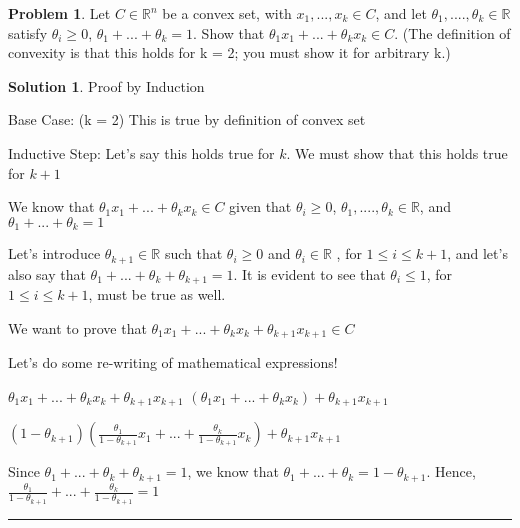 \documentclass{article}
\theoremstyle{definition}
\newtheorem{problem}{Problem}
\def\fline{\rule{0.75\linewidth}{0.5pt}}
\newcommand{\finishline}{\begin{center}\fline\end{center}}
\newtheorem*{solution*}{Solution}
\newenvironment{solution}{\begin{solution*}}{{\finishline} \end{solution*}}
\begin{document}
\begin{problem}
Let $C \in \mathbb{R}^n$ be a convex set, with $x_1, ..., x_k \in C$, and let $\theta_1, ...., \theta_k \in \mathbb{R}$ satisfy $\theta_i \geq 0$, $\theta_1 + ... + \theta_k = 1$. Show that $\theta_1x_1 + ... + \theta_kx_k \in C$. (The definition of convexity is that this holds for k = 2; you must show it for arbitrary k.)

\begin{solution}
    Proof by Induction \newline 

Base Case: (k = 2) \newline 
This is true by definition of convex set \newline 

Inductive Step: \newline
Let's say this holds true for $k$. We must show that this holds true for $k + 1$ \newline 

We know that $\theta_1x_1 + ... + \theta_kx_k \in C$ given that $\theta_i \geq 0$, $\theta_1, ...., \theta_k \in \mathbb{R}$, and $\theta_1 + ... + \theta_k = 1$ \newline 

Let's introduce $\theta_{k + 1} \in \mathbb{R}$ such that $\theta_{i} \geq 0$ and $\theta_i \in \mathbb{R}$ , for $1 \leq i \leq k + 1$, and let's also say that $\theta_1 + ... + \theta_k + \theta_{k + 1} = 1$. It is evident to see that $\theta_{i} \leq 1$, for $1 \leq i \leq k + 1$, must be true as well. \newline

We want to prove that $\theta_1x_1 + ... + \theta_kx_k + \theta_{k + 1}x_{k + 1} \in C$ \newline 

Let's do some re-writing of mathematical expressions! \newline 

$\theta_1x_1 + ... + \theta_kx_k + \theta_{k + 1}x_{k + 1}$ \newline 
$(\theta_1x_1 + ... + \theta_kx_k) + \theta_{k + 1}x_{k + 1}$ \newline 

$(1 - \theta_{k + 1})(\frac{\theta_1}{1 - \theta_{k + 1}}x_1 + ... + \frac{\theta_k}{1 - \theta_{k + 1}}x_k) + \theta_{k + 1}x_{k + 1}$ \newline 


Since $\theta_1 + ... + \theta_k + \theta_{k + 1} = 1$, we know that $\theta_1 + ... + \theta_k = 1 - \theta_{k + 1}$. Hence, $\frac{\theta_1}{1 - \theta_{k + 1}} + ... + \frac{\theta_k}{1 - \theta_{k + 1}} = 1$ \newline 


\end{solution}
\end{problem}
\end{document}
